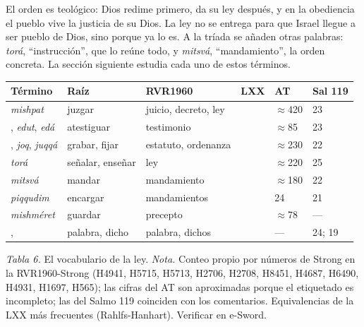 El orden es teológico: Dios redime primero, da su ley después, y en la obediencia el pueblo vive la justicia de su Dios. La ley no se entrega para que Israel llegue a ser pueblo de Dios, sino porque ya lo es. A la tríada se añaden otras palabras:  \emph{torá}, ``instrucción'', que lo reúne todo, y  \emph{mitsvá}, ``mandamiento'', la orden concreta. La sección siguiente estudia cada uno de estos términos.

\begin{center}\small\renewcommand{\arraystretch}{1.18}
\begin{tabular}{@{}L{2.9cm}L{4.0cm}L{2.6cm}L{1.6cm}L{1.3cm}L{1.2cm}@{}}
\toprule
\textbf{Término} & \textbf{Raíz} & \textbf{RVR1960} & \textbf{LXX} & \textbf{AT} & \textbf{Sal 119} \\ \midrule
{} \emph{mishpat} &  juzgar & juicio, decreto, ley &  & $\approx$420 & 23 \\
,  \emph{edut}, \emph{edá} &  atestiguar & testimonio &  & $\approx$85 & 23 \\
,  \emph{joq}, \emph{juqqá} &  grabar, fijar & estatuto, ordenanza &  & $\approx$230 & 22 \\
 \emph{torá} &  señalar, enseñar & ley &  & $\approx$220 & 25 \\
 \emph{mitsvá} &  mandar & mandamiento &  & $\approx$180 & 22 \\
 \emph{piqqudim} &  encargar & mandamientos &  & 24 & 21 \\
 \emph{mishméret} &  guardar & precepto &  & $\approx$78 & --- \\
,  & palabra, dicho & palabra, dichos &  & --- & 24; 19 \\
\bottomrule
\end{tabular}\par
{\footnotesize\color{gris}\textit{Tabla 6.} El vocabulario de la ley. \textit{Nota.} Conteo propio por números de Strong en la RVR1960-Strong (H4941, H5715, H5713, H2706, H2708, H8451, H4687, H6490, H4931, H1697, H565); las cifras del AT son aproximadas porque el etiquetado es incompleto; las del Salmo 119 coinciden con los comentarios. Equivalencias de la LXX más frecuentes (Rahlfs-Hanhart). Verificar en e-Sword.}
\end{center}

